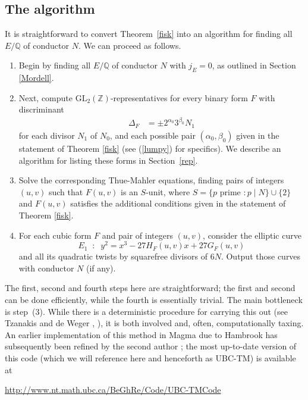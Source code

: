 \subsection{The algorithm}
It is straightforward to convert Theorem~\ref{fisk} into an algorithm for finding all $E/\mathbb{Q}$ of conductor $N$. We can proceed as follows.
\begin{enumerate}
\item Begin by finding all $E/\mathbb{Q}$ of conductor $N$ with $j_E=0$, as outlined in Section \ref{Mordell}.
\item Next, compute $\mbox{GL}_2(\mathbb{Z})$-representatives for every binary form $F$ with discriminant
\begin{align*}
\Delta_F &= \pm 2^{\alpha_0} 3^{\beta_0} N_1
\end{align*}
for each divisor $N_1$ of $N_0$, and each possible pair $(\alpha_0,\beta_0)$ given in the statement of Theorem 
\ref{fisk} (see (\ref{lumpy}) for specifics). We describe an algorithm for listing these forms in Section~\ref{rep}. 
\item Solve the corresponding Thue-Mahler equations, finding pairs of integers $(u,v)$ such that
$F(u,v)$ is an $S$-unit, where $S = \{ p \mbox{ prime } : p \mid N \} \cup \{2 \}$ and $F(u,v)$ satisfies the additional conditions given in the statement of Theorem 
\ref{fisk}.
\item For each cubic form $F$ and pair of integers $(u,v)$, consider the elliptic curve
$$
E_1 \; \; : \; \; y^2 = x^3 -27 H_F(u,v) x +27 G_F(u,v)
$$
and all its quadratic twists by squarefree divisors of $6N$. Output those curves with conductor $N$ (if any).
\end{enumerate}
The first, second and fourth steps here are straightforward; the first and second can be done efficiently, while the fourth is essentially 
trivial. The main bottleneck is step~(3). While there is a deterministic procedure for carrying this out (see Tzanakis and de 
Weger \cite{TW2}, \cite{TW3}), it is both involved and, often, computationally taxing. An earlier  implementation of this method in Magma due to Hambrook \cite{Ham} has subsequently been refined by the second author \cite{GhKaMaSi}; the most up-to-date version of this code (which we will reference here and henceforth as UBC-TM) is available at 
\begin{center}
\url{http://www.nt.math.ubc.ca/BeGhRe/Code/UBC-TMCode}
\end{center}

